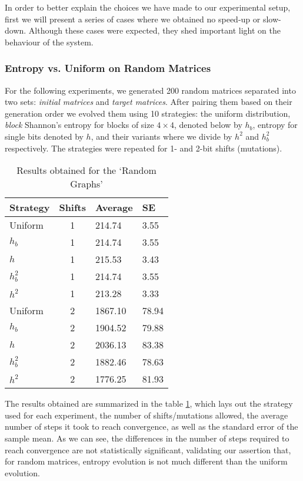 \documentclass[10pt]{article}
\begin{document}
In order to better explain the choices we have made to our experimental setup, first we will present a series of cases where we obtained no speed-up or slow-down. Although these cases were expected, they shed important light on the behaviour of the system.


\subsubsection{Entropy vs. Uniform on Random
    Matrices}\label{entropy-vs-uniform-on-random-matrices.}

For the following experiments, we generated 200 random matrices separated
into two sets: \textit{initial matrices} and \textit{target matrices}.
After pairing them based on their generation order we evolved them using 10 strategies: the uniform distribution, \textit{block} Shannon's entropy for blocks of size \(4 \times 4\),
denoted below by \(h_b\), entropy for single bits denoted by \(h\), and
their variants where we divide by \(h^2\) and \(h^2_b\)
respectively. The strategies were repeated for 1- and 2-bit shifts (mutations).


\begin{table}[!t]
    \centering
    \caption{Results obtained for the `Random Graphs'}
    \label{hR}
\begin{tabular}[t]{@{}l|c|l|l@{}}
    \hline
    Strategy & Shifts & Average & SE \\
    \hline
    Uniform & 1 & 214.74 & 3.55 \\
    \(h_b\) & 1 & 214.74 & 3.55 \\
    \(h\) & 1 & 215.53 & 3.43 \\
    \(h^2_b\) & 1 & 214.74 & 3.55 \\
    \(h^2\) & 1 & 213.28 & 3.33 \\
    Uniform & 2 & 1867.10 & 78.94 \\
    \(h_b\) & 2 & 1904.52 & 79.88 \\
    \(h\) & 2 & 2036.13 & 83.38 \\
    \(h^2_b\) & 2 & 1882.46 & 78.63 \\
    \(h^2\) & 2 & 1776.25 & 81.93 \\
    \hline
\end{tabular}
\end{table}

The results obtained are summarized in the table \ref{hR}, which  lays out the strategy used for each experiment, the number of shifts/mutations allowed, the average number of steps it took to reach convergence, as well as the standard error of the sample mean. As we can see, the differences in the number of steps required to reach convergence are not statistically significant, validating our assertion that, for random matrices, entropy evolution is not much different than the uniform evolution.
\end{document}
